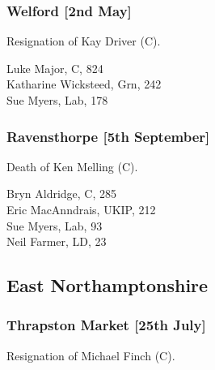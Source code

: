 \documentclass[a4paper,openany,10pt]{book}
\begin{document}
\subsubsection*{Welford \hspace*{\fill}\nolinebreak[1]%
\enspace\hspace*{\fill}
[2nd May]}


Resignation of Kay Driver (C).



Luke Major, C, 824\\
Katharine Wicksteed, Grn, 242\\
Sue Myers, Lab, 178\\


\subsubsection*{Ravensthorpe \hspace*{\fill}\nolinebreak[1]%
\enspace\hspace*{\fill}
[5th September]}


Death of Ken Melling (C).



Bryn Aldridge, C, 285\\
Eric MacAnndrais, UKIP, 212\\
Sue Myers, Lab, 93\\
Neil Farmer, LD, 23\\


\subsection*{East Northamptonshire}

\subsubsection*{Thrapston Market \hspace*{\fill}\nolinebreak[1]%
\enspace\hspace*{\fill}
[25th July]}


Resignation of Michael Finch (C).
\end{document}
